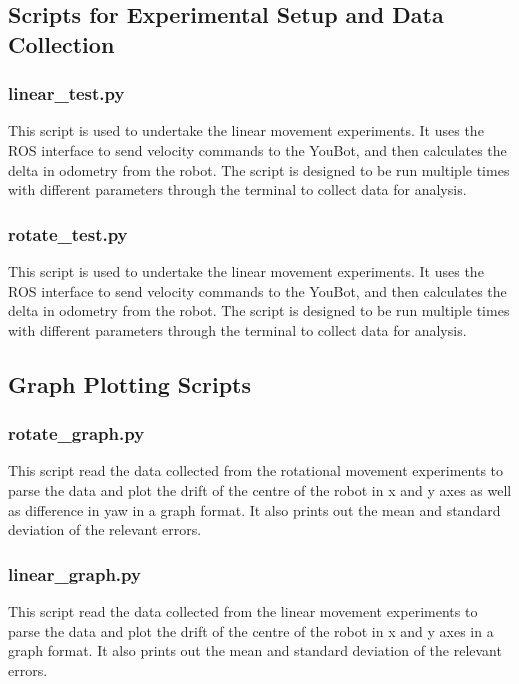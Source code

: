\documentclass[a4paper, 12pt]{article}
\begin{document}
    \pagebreak

    \subsection{Scripts for Experimental Setup and Data Collection}
    \label{appendix:experiment_scripts}
    \subsubsection{linear\_test.py}
    This script is used to undertake the linear movement experiments. It uses the ROS interface to send velocity commands to the YouBot, and then calculates the delta in odometry from the robot. The script is designed to be run multiple times with different parameters through the terminal to collect data for analysis.
    
    \pagebreak
    \subsubsection{rotate\_test.py}
    This script is used to undertake the linear movement experiments. It uses the ROS interface to send velocity commands to the YouBot, and then calculates the delta in odometry from the robot. The script is designed to be run multiple times with different parameters through the terminal to collect data for analysis.
    
    \pagebreak
    \subsection{Graph Plotting Scripts}
    \label{appendix:graph_scripts}
    \subsubsection{rotate\_graph.py}
    This script read the data collected from the rotational movement experiments to parse the data and plot the drift of the centre of the robot in x and y axes as well as difference in yaw in a graph format. It also prints out the mean and standard deviation of the relevant errors. 
    
    \pagebreak
    \subsubsection{linear\_graph.py}
    This script read the data collected from the linear movement experiments to parse the data and plot the drift of the centre of the robot in x and y axes in a graph format. It also prints out the mean and standard deviation of the relevant errors. 
    
    \pagebreak
\end{document}
